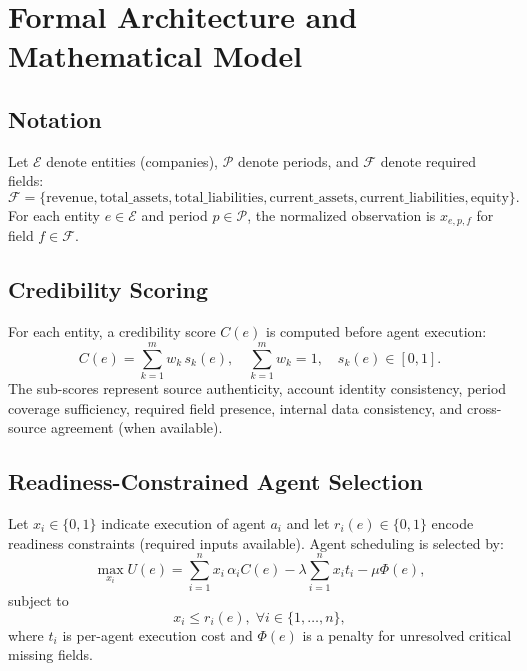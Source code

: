 \documentclass[conference]{IEEEtran}
\begin{document}
\section{Formal Architecture and Mathematical Model}
\subsection{Notation}
Let $\mathcal{E}$ denote entities (companies), $\mathcal{P}$ denote periods, and $\mathcal{F}$ denote required fields:
\begin{equation}
\mathcal{F}=\{\text{revenue},\text{total\_assets},\text{total\_liabilities},\text{current\_assets},\text{current\_liabilities},\text{equity}\}.
\end{equation}
For each entity $e\in\mathcal{E}$ and period $p\in\mathcal{P}$, the normalized observation is $x_{e,p,f}$ for field $f\in\mathcal{F}$.

\subsection{Credibility Scoring}
For each entity, a credibility score $C(e)$ is computed before agent execution:
\begin{equation}
C(e)=\sum_{k=1}^{m} w_k\,s_k(e),\quad \sum_{k=1}^{m}w_k=1,\quad s_k(e)\in[0,1].
\end{equation}
The sub-scores represent source authenticity, account identity consistency, period coverage sufficiency, required field presence, internal data consistency, and cross-source agreement (when available).

\subsection{Readiness-Constrained Agent Selection}
Let $x_i\in\{0,1\}$ indicate execution of agent $a_i$ and let $r_i(e)\in\{0,1\}$ encode readiness constraints (required inputs available). Agent scheduling is selected by:
\begin{equation}
\max_{x_i} U(e)=\sum_{i=1}^{n}x_i\,\alpha_i C(e)-\lambda\sum_{i=1}^{n}x_i t_i-\mu\Phi(e),
\end{equation}
subject to
\begin{equation}
x_i\le r_i(e),\;\forall i\in\{1,\ldots,n\},
\end{equation}
where $t_i$ is per-agent execution cost and $\Phi(e)$ is a penalty for unresolved critical missing fields.
\end{document}
